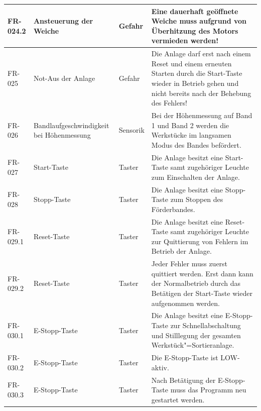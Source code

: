 \documentclass[oneside,a4paper,titlepage]{scrartcl} %
\begin{document}
\begin{small}
\begin{longtable}{|C{2cm}|L{4cm}|C{1.5cm}|L{5.5cm}|}
  \hline
   FR-024.2 & Ansteuerung der Weiche & Gefahr & Eine dauerhaft geöffnete Weiche muss aufgrund von Überhitzung des Motors vermieden werden!\\
  \hline
  FR-025 & Not-Aus der Anlage & Gefahr & Die Anlage darf erst nach einem Reset und einem erneuten Starten durch die Start-Taste wieder in Betrieb gehen und nicht bereits nach der Behebung des Fehlers!\\
  \hline
   FR-026 & Bandlaufgeschwindigkeit bei Höhenmessung & Sensorik & Bei der Höhenmessung auf Band 1 und Band 2 werden die Werkstücke im langsamen Modus des Bandes befördert.\\
  \hline
  FR-027 & Start-Taste & Taster & Die Anlage besitzt eine Start-Taste samt zugehöriger Leuchte zum Einschalten der Anlage.\\
  \hline
   FR-028 & Stopp-Taste & Taster & Die Anlage besitzt eine Stopp-Taste zum Stoppen des Förderbandes.\\
  \hline
  FR-029.1 & Reset-Taste & Taster & Die Anlage besitzt eine Reset-Taste samt zugehöriger Leuchte zur Quittierung von Fehlern im Betrieb der Anlage.\\
  \hline
  FR-029.2 & Reset-Taste & Taster & Jeder Fehler muss zuerst quittiert werden. Erst dann kann der Normalbetrieb durch das Betätigen der Start-Taste wieder aufgenommen werden.\\
  \hline
   FR-030.1 & E-Stopp-Taste & Taster & Die Anlage besitzt eine E-Stopp-Taste zur Schnellabschaltung und Stilllegung der gesamten Werkstück"=Sortieranlage.\\
  \hline
   FR-030.2 & E-Stopp-Taste & Taster & Die E-Stopp-Taste ist LOW-aktiv.\\
   \hline
   FR-030.3 & E-Stopp-Taste & Taster & Nach Betätigung der E-Stopp-Taste muss das Programm neu gestartet werden.\\
  \hline
 \end{longtable}
\end{small}

\newpage

\end{document}
